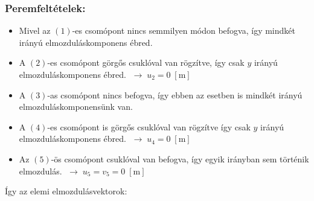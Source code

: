 \documentclass[12pt,a4paper]{article}
\def\m{\; \left[\mathrm{m}\right]}
\begin{document}
\subsubsection*{Peremfeltételek:}
\begin{itemize}
    \item  Mivel az $\left(1\right)$-es csomópont nincs semmilyen módon
          befogva, így mindkét irányú elmozduláskomponens ébred.
    \item A  $\left(2\right)$-es csomópont görgős csuklóval van rögzítve, így
          csak $y$ irányú elmozduláskomponens ébred. $\; \rightarrow \; \boxed{u_{2}=0 \m}$
    \item A  $\left(3\right)$-as csomópont nincs befogva, így ebben az esetben is mindkét
          irányú elmozduláskomponensünk van.
    \item A $\left(4\right)$-es csomópont is görgős csuklóval van rögzítve
          így csak $y$ irányú elmozduláskomponens ébred. $\; \rightarrow \; \boxed{u_{4}=0 \m}$
    \item Az $\left(5\right)$-ös csomópont csuklóval van befogva, így egyik irányban sem történik
          elmozdulás. $\; \rightarrow \; \boxed{u_{5}=v_{5}=0 \m}$
\end{itemize}
Így az elemi elmozdulásvektorok:
\end{document}
